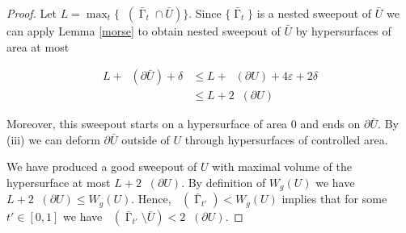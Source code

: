 \documentclass[12pt]{amsart}
\DeclareMathOperator{\Hn}{\mathcal{H}^n}
\DeclareMathOperator{\G}{\Gamma}
\DeclareMathOperator{\Om}{\Omega}
\theoremstyle{definition}
\begin{document}
\begin{proof}


Let $L = \max_t \{\Hn(\bar{\G}_{t} \cap \bar{U}) \}$.
Since $\{ \bar{\G}_t \}$ is a nested sweepout of
$\bar{U}$
we can apply Lemma \ref*{morse} to obtain
nested sweepout of $\bar{U}$ by hypersurfaces
of area at most 

\begin{align*} 
L + \Hn(\partial \bar{U}) + \delta & \leq L + \Hn(\partial U) + 4 \varepsilon + 2 \delta \\
    & \leq L +  2 \Hn( \partial U)
\end{align*}

Moreover, this sweepout starts on a hypersurface of
area $0$ and ends on $\partial \bar{U}$.
By (iii) we can deform
$\partial \bar{U}$ outside of $U$ through hypersurfaces
of controlled area. 



We have produced a
good sweepout of $U$ with maximal volume of the hypersurface at most
$L +  2 \Hn( \partial U)$. 
By definition of $W_g(U)$ we have $L +  2 \Hn( \partial U) \leq W_g(U)$.
Hence, 
$\Hn(\bar{\G}_{t'}) < W_g(U)$
implies that for some $t' \in [0,1]$ we have $\Hn(\bar{\G}_{t'} \setminus \bar{U}) 
<2 \Hn( \partial U)$.

\end{proof}
\end{document}
